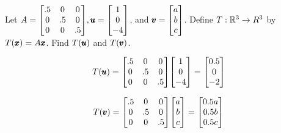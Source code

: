 \documentclass{../mathhomework}
\newenvironment{Mat}{\begin{bmatrix}}{\end{bmatrix}}
\begin{document}
\begin{problem}[1.8\#2]
    Let $A = \begin{Mat}
        .5 & 0 & 0 \\
        0 & .5 & 0 \\
        0 & 0 & .5 \\
    \end{Mat}, \Vect{u} = \begin{Mat}
        1 \\ 0 \\ -4
    \end{Mat}$, and $\Vect{v} = \begin{Mat}
        a \\ b \\ c
    \end{Mat}$. Define $T: \mathbb{R}^3 \to R^3$ by $T(\pmb{x}) = A\pmb{x}$. Find $T(\pmb{u})$ and $T(\pmb{v})$.

    \begin{solution}
        \begin{equation*}
            T(\Vect{u}) = \begin{Mat}
                .5 & 0 & 0 \\
                0 & .5 & 0 \\
                0 & 0 & .5 \\
            \end{Mat} \begin{Mat}
                1 \\ 0 \\ -4
            \end{Mat} = \begin{Mat}
                0.5 \\ 0 \\ -2
            \end{Mat}
        \end{equation*}

        \begin{equation*}
            T(\Vect{v}) = \begin{Mat}
                .5 & 0 & 0 \\
                0 & .5 & 0 \\
                0 & 0 & .5 \\
            \end{Mat} \begin{Mat}
                a \\ b \\ c
            \end{Mat} = \begin{Mat}
                0.5a \\ 0.5b \\ 0.5c
            \end{Mat}
        \end{equation*}
    \end{solution}
\end{problem}
\end{document}

